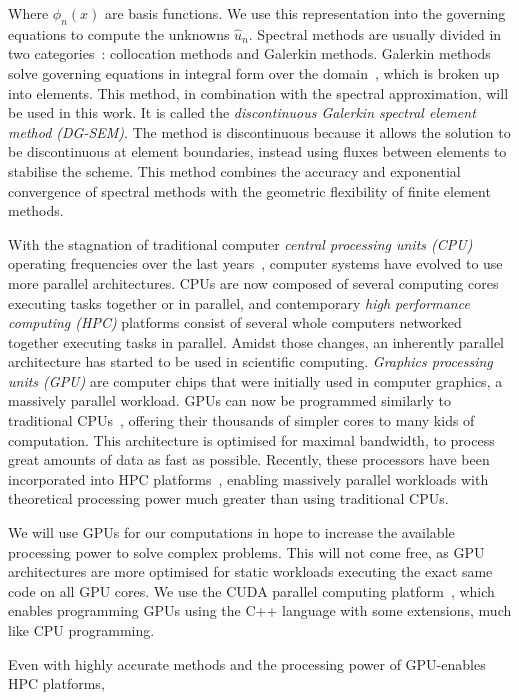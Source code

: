 Where $\phi _n(x)$ are basis functions. We use this representation into the governing equations to
compute the unknowns $\widehat{u}_n$. Spectral methods are usually divided in two
categories~\cite{Karniadakis2005}: collocation methods and Galerkin methods. Galerkin methods solve
governing equations in integral form over the domain~\cite{Reed1973}, which is broken up into
elements. This method, in combination with the spectral approximation, will be used in this work. It
is called the \textit{discontinuous Galerkin spectral element method (DG-SEM)}. The method is
discontinuous because it allows the solution to be discontinuous at element boundaries, instead
using fluxes between elements to stabilise the scheme. This method combines the accuracy and
exponential convergence of spectral methods with the geometric flexibility of finite element
methods. 

With the stagnation of traditional computer \textit{central processing units (CPU)} operating
frequencies over the last years~\cite{Parkhurst2006}, computer systems have evolved to use more
parallel architectures. CPUs are now composed of several computing cores~\cite{Nayfeh1997} executing
tasks together or in parallel, and contemporary \textit{high performance computing (HPC)} platforms
consist of several whole computers networked together executing tasks in parallel. Amidst those
changes, an inherently parallel architecture has started to be used in scientific computing.
\textit{Graphics processing units (GPU)} are computer chips that were initially used in computer
graphics, a massively parallel workload. GPUs can now be programmed similarly to traditional
CPUs~\cite{Owens2008}, offering their thousands of simpler cores to many kids of computation. This
architecture is optimised for maximal bandwidth, to process great amounts of data as fast as
possible. Recently, these processors have been incorporated into HPC platforms~\cite{Fan2004},
enabling massively parallel workloads with theoretical processing power much greater than using
traditional CPUs.

We will use GPUs for our computations in hope to increase the available processing power to solve
complex problems. This will not come free, as GPU architectures are more optimised for static
workloads executing the exact same code on all GPU cores. We use the CUDA parallel computing
platform~\cite{Garland2008}, which enables programming GPUs using the C++ language with some
extensions, much like CPU programming.

Even with highly accurate methods and the processing power of GPU-enables HPC platforms, 


